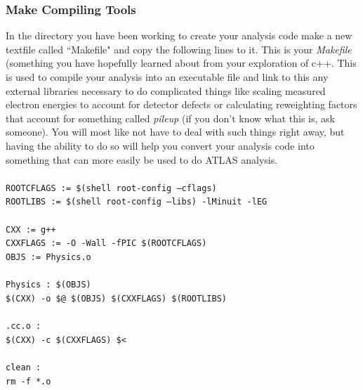 \documentclass[12pt]{article}
\begin{document}
\subsubsection{Make Compiling Tools} 
In the directory you have been working to create your analysis code make a new textfile called ``Makefile" and copy the following lines to it.  This is your \textit{Makefile} (something you have hopefully learned about from your exploration of c++.  This is used to compile your analysis into an executable file and link to this any external libraries necessary to do complicated things like scaling measured electron energies to account for detector defects or calculating reweighting factors that account for something called \textit{pileup} (if you don't know what this is, ask someone).  You will most like not have to deal with such things right away, but having the ability to do so will help you convert your analysis code into something that can more easily be used to do ATLAS analysis.\\
\texttt{\\
\hspace*{0.0cm}ROOTCFLAGS := \$(shell root-config --cflags)\\
\hspace*{0.0cm}ROOTLIBS := \$(shell root-config --libs) -lMinuit -lEG\\
\hspace*{0.0cm}\\
\hspace*{0.0cm}CXX := g++\\
\hspace*{0.0cm}CXXFLAGS := -O -Wall -fPIC \$(ROOTCFLAGS)\\
\hspace*{0.0cm}OBJS := Physics.o\\
\hspace*{0.0cm}\\
\hspace*{0.0cm}Physics : \$(OBJS)\\
\hspace*{0.3cm}    \$(CXX) -o \$@ \$(OBJS) \$(CXXFLAGS) \$(ROOTLIBS)\\
\hspace*{0.0cm}\\
\hspace*{0.0cm}.cc.o :\\
\hspace*{0.3cm}    \$(CXX) -c \$(CXXFLAGS) \$<\\
\hspace*{0.0cm}\\
\hspace*{0.0cm}clean :\\
\hspace*{0.3cm}    rm -f *.o\\
}\\
\end{document}

